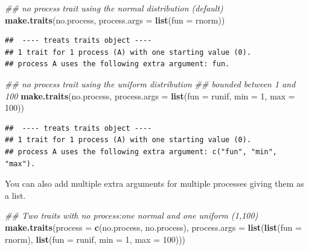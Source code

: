 \documentclass[
]{book}
\newenvironment{Shaded}{\begin{snugshade}}{\end{snugshade}}
\newcommand{\CommentTok}[1]{\textcolor[rgb]{0.56,0.35,0.01}{\textit{#1}}}
\newcommand{\DataTypeTok}[1]{\textcolor[rgb]{0.13,0.29,0.53}{#1}}
\newcommand{\DecValTok}[1]{\textcolor[rgb]{0.00,0.00,0.81}{#1}}
\newcommand{\KeywordTok}[1]{\textcolor[rgb]{0.13,0.29,0.53}{\textbf{#1}}}
\newcommand{\NormalTok}[1]{#1}
\begin{document}
\begin{Shaded}
\begin{Highlighting}[]
\CommentTok{\#\# no process trait using the normal distribution (default)}
\KeywordTok{make.traits}\NormalTok{(no.process, }\DataTypeTok{process.args =} \KeywordTok{list}\NormalTok{(}\DataTypeTok{fun =}\NormalTok{ rnorm))}
\end{Highlighting}
\end{Shaded}

\begin{verbatim}
##  ---- treats traits object ---- 
## 1 trait for 1 process (A) with one starting value (0).
## process A uses the following extra argument: fun.
\end{verbatim}

\begin{Shaded}
\begin{Highlighting}[]
\CommentTok{\#\# no process trait using the uniform distribution}
\CommentTok{\#\# bounded between 1 and 100}
\KeywordTok{make.traits}\NormalTok{(no.process, }\DataTypeTok{process.args =} \KeywordTok{list}\NormalTok{(}\DataTypeTok{fun =}\NormalTok{ runif, }\DataTypeTok{min =} \DecValTok{1}\NormalTok{, }\DataTypeTok{max =} \DecValTok{100}\NormalTok{))}
\end{Highlighting}
\end{Shaded}

\begin{verbatim}
##  ---- treats traits object ---- 
## 1 trait for 1 process (A) with one starting value (0).
## process A uses the following extra argument: c("fun", "min", "max").
\end{verbatim}

You can also add multiple extra arguments for multiple processes giving them as a list.

\begin{Shaded}
\begin{Highlighting}[]
\CommentTok{\#\# Two traits with no process:one normal and one uniform (1,100)}
\KeywordTok{make.traits}\NormalTok{(}\DataTypeTok{process =} \KeywordTok{c}\NormalTok{(no.process, no.process),}
            \DataTypeTok{process.args =} \KeywordTok{list}\NormalTok{(}\KeywordTok{list}\NormalTok{(}\DataTypeTok{fun =}\NormalTok{ rnorm),}
                                \KeywordTok{list}\NormalTok{(}\DataTypeTok{fun =}\NormalTok{ runif, }\DataTypeTok{min =} \DecValTok{1}\NormalTok{, }\DataTypeTok{max =} \DecValTok{100}\NormalTok{)))}
\end{Highlighting}
\end{Shaded}
\end{document}
